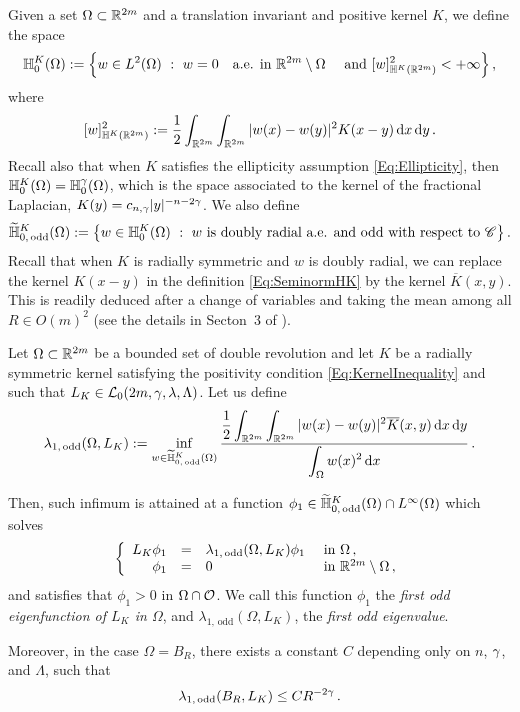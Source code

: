 Given a set $\Omega \subset \mathbb{R}^{2m}$ and a translation invariant and positive kernel $K$, we define the space
$$
\mathbb{H}^K_0(\Omega) := \left \{ w \in L^2(\Omega) \ : \ w = 0 \quad \textrm{a.e. in } \mathbb{R}^{2m} \setminus \Omega \quad \textrm{ and } [w]^2_{\mathbb{H}^K(\mathbb{R}^{2m})} < + \infty \right \},
$$
where
\begin{equation}
	\label{Eq:SeminormHK}
[w]^2_{\mathbb{H}^K(\mathbb{R}^{2m})} := \dfrac{1}{2}\int_{\mathbb{R}^{2m}} \int_{\mathbb{R}^{2m}} |w(x) - w(y)|^2 K(x-y) \,\mathrm{d} x \,\mathrm{d} y\,.
\end{equation}
Recall also that when $K$ satisfies the ellipticity assumption \eqref{Eq:Ellipticity}, then $\mathbb{H}^K_0 (\Omega) = \mathbb{H}^\gamma_0 (\Omega)$, which is the space associated to the kernel of the fractional Laplacian, $K(y) = c_{n,\gamma}|y|^{-n-2\gamma}$. We also define
$$
\widetilde{\mathbb{H}}^K_{0, \, \mathrm{odd}}(\Omega) := \left \{ w \in \mathbb{H}^K_0(\Omega) \ : \ w \textrm{ is doubly radial a.e. and odd with respect to } \mathscr{C} \right \}.
$$
Recall that when $K$ is radially symmetric and $w$ is doubly radial, we can replace the kernel $K(x-y)$ in the definition \eqref{Eq:SeminormHK} by the kernel $\overline{K}(x,y)$. This is readily deduced after a change of variables and taking the mean among all $R\in O(m)^2$ (see the details in Secton~3 of \cite{FelipeSanz-Perela:IntegroDifferentialI}).




\begin{lemma}
	\label{Lemma:FirstOddEigenfunction}
	Let $\Omega\subset \mathbb{R}^{2m} $ be a bounded set of double revolution and let  $K$ be a radially symmetric kernel satisfying the positivity condition \eqref{Eq:KernelInequality} and such that $L_K\in \mathcal{L}_0(2m, \gamma, \lambda, \Lambda)$. Let us define 
	$$
	\lambda_{1, \, \mathrm{odd}}(\Omega, L_K) := \inf_{w \in \widetilde{\mathbb{H}}^K_{0, \, \mathrm{odd}}(\Omega)} \dfrac{\dfrac{1}{2}  \displaystyle\int_{\mathbb{R}^{2m}} \int_{\mathbb{R}^{2m}} |w(x) - w(y)|^2 \overline{K}(x,y) \,\mathrm{d} x \,\mathrm{d} y}{ \displaystyle \int_\Omega w(x)^2 \,\mathrm{d} x}\,.
	$$
	
	Then, such infimum is attained at a function $\phi_1\in \widetilde{\mathbb{H}}^K_{0, \, \mathrm{odd}}(\Omega)\cap L^\infty(\Omega)$ which solves
	$$
	\left\{\begin{array}{rcll}
	L_K \phi_1 &=& \lambda_{1, \, \mathrm{odd}}(\Omega, L_K) \phi_1 & \textrm{ in } \Omega\,,\\
	\phi_1 & = & 0 & \textrm{ in } \mathbb{R}^{2m}\setminus \Omega\,,
	\end{array} \right.
	$$
	and satisfies that $\phi_1 > 0$ in $\Omega \cap \mathcal{O}$.	We call this function $\phi_1$ the \emph{first odd eigenfunction of $L_K$ in $\Omega$}, and $\lambda_{1, \, \mathrm{odd}}(\Omega, L_K) $, the \emph{first odd eigenvalue}. 
	
	Moreover, in the case $\Omega = B_R$, there exists a constant $C$ depending only on $n$, $\gamma$, and $\Lambda$, such that
	$$
	\lambda_{1, \, \mathrm{odd}}(B_R, L_K) \leq C R^{-2\gamma}\,. 
	$$ 
\end{lemma}


